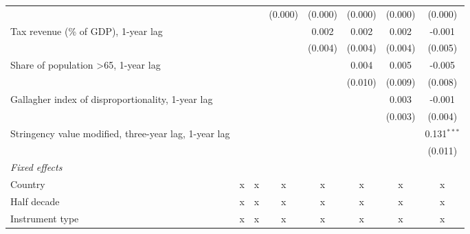\begin{tabular}{lccccccc}
                                                                           &              &              & (0.000)      & (0.000)      & (0.000)      & (0.000)      & (0.000)\\   
   Tax revenue (\% of GDP), 1-year lag                                     &              &              &              & 0.002        & 0.002        & 0.002        & -0.001\\   
                                                                           &              &              &              & (0.004)      & (0.004)      & (0.004)      & (0.005)\\   
   Share of population >65, 1-year lag                                     &              &              &              &              & 0.004        & 0.005        & -0.005\\   
                                                                           &              &              &              &              & (0.010)      & (0.009)      & (0.008)\\   
   Gallagher index of disproportionality, 1-year lag                       &              &              &              &              &              & 0.003        & -0.001\\   
                                                                           &              &              &              &              &              & (0.003)      & (0.004)\\   
   Stringency value modified, three-year lag, 1-year lag                   &              &              &              &              &              &              & 0.131$^{***}$\\   
                                                                           &              &              &              &              &              &              & (0.011)\\   
   \emph{Fixed effects}\\
   Country                                                                 & x            & x            & x            & x            & x            & x            & x\\  
   Half decade                                                             & x            & x            & x            & x            & x            & x            & x\\  
   Instrument type                                                         & x            & x            & x            & x            & x            & x            & x\\  

\end{tabular}
